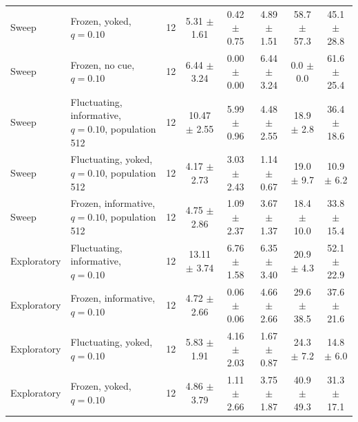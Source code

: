\begin{table}[!ht]
\begin{tabular}{@{}llcccccc@{}}
Sweep & Frozen, yoked, $q=0.10$ & 12 & 5.31 $\pm$ 1.61 & 0.42 $\pm$ 0.75 & 4.89 $\pm$ 1.51 & 58.7 $\pm$ 57.3 & 45.1 $\pm$ 28.8\\
Sweep & Frozen, no cue, $q=0.10$ & 12 & 6.44 $\pm$ 3.24 & 0.00 $\pm$ 0.00 & 6.44 $\pm$ 3.24 & 0.0 $\pm$ 0.0 & 61.6 $\pm$ 25.4\\
Sweep & Fluctuating, informative, $q=0.10$, population 512 & 12 & 10.47 $\pm$ 2.55 & 5.99 $\pm$ 0.96 & 4.48 $\pm$ 2.55 & 18.9 $\pm$ 2.8 & 36.4 $\pm$ 18.6\\
Sweep & Fluctuating, yoked, $q=0.10$, population 512 & 12 & 4.17 $\pm$ 2.73 & 3.03 $\pm$ 2.43 & 1.14 $\pm$ 0.67 & 19.0 $\pm$ 9.7 & 10.9 $\pm$ 6.2\\
Sweep & Frozen, informative, $q=0.10$, population 512 & 12 & 4.75 $\pm$ 2.86 & 1.09 $\pm$ 2.37 & 3.67 $\pm$ 1.37 & 18.4 $\pm$ 10.0 & 33.8 $\pm$ 15.4\\
Exploratory & Fluctuating, informative, $q=0.10$ & 12 & 13.11 $\pm$ 3.74 & 6.76 $\pm$ 1.58 & 6.35 $\pm$ 3.40 & 20.9 $\pm$ 4.3 & 52.1 $\pm$ 22.9\\
Exploratory & Frozen, informative, $q=0.10$ & 12 & 4.72 $\pm$ 2.66 & 0.06 $\pm$ 0.06 & 4.66 $\pm$ 2.66 & 29.6 $\pm$ 38.5 & 37.6 $\pm$ 21.6\\
Exploratory & Fluctuating, yoked, $q=0.10$ & 12 & 5.83 $\pm$ 1.91 & 4.16 $\pm$ 2.03 & 1.67 $\pm$ 0.87 & 24.3 $\pm$ 7.2 & 14.8 $\pm$ 6.0\\
Exploratory & Frozen, yoked, $q=0.10$ & 12 & 4.86 $\pm$ 3.79 & 1.11 $\pm$ 2.66 & 3.75 $\pm$ 1.87 & 40.9 $\pm$ 49.3 & 31.3 $\pm$ 17.1\\
\bottomrule\end{tabular}\end{table}


